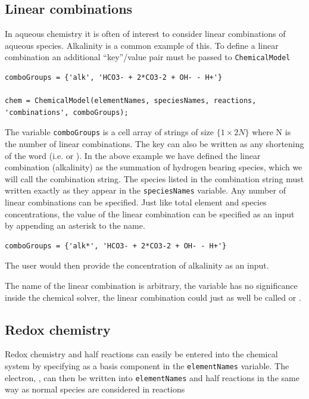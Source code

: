 \documentclass{article}
\begin{document}
\subsection{Linear combinations}

In aqueous chemistry it is often of interest to consider linear combinations of aqueous species. Alkalinity is a common example of this. To define a linear combination an additional ``key''/value pair must be passed to \verb|ChemicalModel|

\begin{lstlisting}
comboGroups = {'alk', 'HCO3- + 2*CO3-2 + OH- - H+'}

chem = ChemicalModel(elementNames, speciesNames, reactions, 'combinations', comboGroups);
\end{lstlisting}
The variable \verb|comboGroups| is a cell array of strings of size $\{1\times2N\}$ where N is the number of linear combinations. The key  can also be written as any shortening of the word (i.e.  or ). In the above example we have defined the linear combination  (alkalinity) as the summation of hydrogen bearing species, which we will call the combination string. The species listed in the combination string must written exactly as they appear in the \verb|speciesNames| variable. Any number of linear combinations can be specified. Just like total element and species concentrations, the value of the linear combination can be specified as an input by appending an asterisk to the name.

\begin{lstlisting}
comboGroups = {'alk*', 'HCO3- + 2*CO3-2 + OH- - H+'}
\end{lstlisting}
The user would then provide the concentration of alkalinity as an input. 

The name of the linear combination is arbitrary, the variable  has no significance inside the chemical solver, the linear combination could just as well be called  or . 

\subsection{Redox chemistry}

Redox chemistry and half reactions can easily be entered into the chemical system by specifying  as a basis component in the \verb|elementNames| variable. The electron, , can then be written into \verb|elementNames| and half reactions in the same way as normal species are considered in reactions
\end{document}
